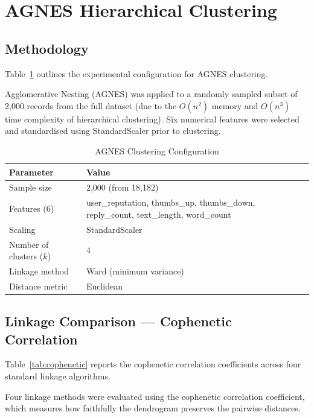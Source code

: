 \documentclass[12pt,a4paper]{article}
\begin{document}
\section{AGNES Hierarchical Clustering}

\subsection{Methodology}

Table~\ref{tab:agnes_config} outlines the experimental configuration for AGNES clustering.

Agglomerative Nesting (AGNES) was applied to a randomly sampled subset of 2{,}000 records from the full dataset (due to the $O(n^2)$ memory and $O(n^3)$ time complexity of hierarchical clustering). Six numerical features were selected and standardised using StandardScaler prior to clustering.

\begin{table}[H]
\centering
\caption{AGNES Clustering Configuration}
\label{tab:agnes_config}
\begin{tabular}{l l}
\toprule
\textbf{Parameter} & \textbf{Value} \\
\midrule
Sample size & 2{,}000 (from 18{,}182) \\
Features (6) & user\_reputation, thumbs\_up, thumbs\_down, reply\_count, text\_length, word\_count \\
Scaling & StandardScaler \\
Number of clusters ($k$) & 4 \\
Linkage method & Ward (minimum variance) \\
Distance metric & Euclidean \\
\bottomrule
\end{tabular}
\end{table}

\subsection{Linkage Comparison --- Cophenetic Correlation}

Table~\ref{tab:cophenetic} reports the cophenetic correlation coefficients across four standard linkage algorithms.

Four linkage methods were evaluated using the cophenetic correlation coefficient, which measures how faithfully the dendrogram preserves the pairwise distances.
\end{document}
